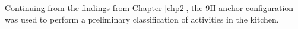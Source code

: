 Continuing from the findings from Chapter \ref{chp2}, the 9H anchor configuration
was used to perform a preliminary classification of activities in the 
kitchen.